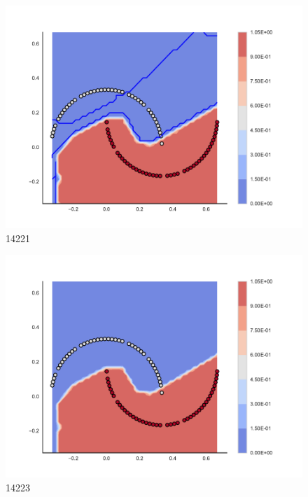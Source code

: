\begin{subfigure}[b]{0.09\textwidth}
    \includegraphics[clip, trim=2.35cm 1.75cm 4.5cm 0cm,width=\textwidth]{img/convergence/14221.pdf}
    \caption{14221}
    \label{fig:convergence_14221}
\end{subfigure}
%
\begin{subfigure}[b]{0.09\textwidth}
    \includegraphics[clip, trim=2.35cm 1.75cm 4.5cm 0cm,width=\textwidth]{img/convergence/14223.pdf}
    \caption{14223}
    \label{fig:convergence_14223}
\end{subfigure}
%
